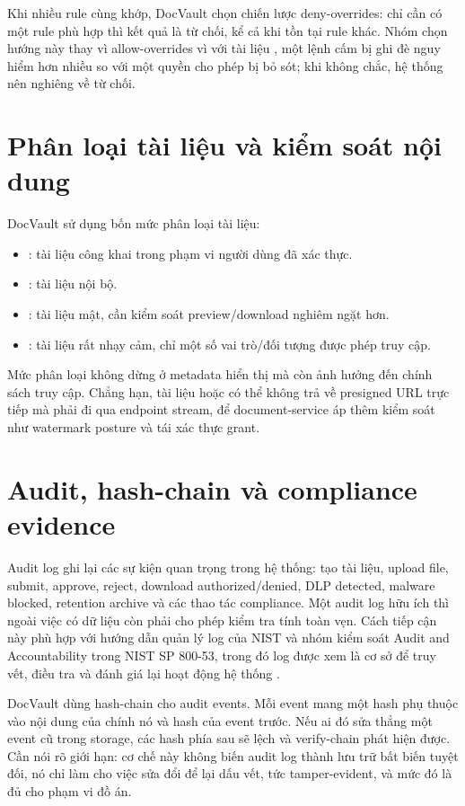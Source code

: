 Khi nhiều rule cùng khớp, DocVault chọn chiến lược deny-overrides: chỉ cần có một rule  phù hợp thì kết quả là từ chối, kể cả khi tồn tại rule  khác. Nhóm chọn hướng này thay vì allow-overrides vì với tài liệu , một lệnh cấm bị ghi đè nguy hiểm hơn nhiều so với một quyền cho phép bị bỏ sót; khi không chắc, hệ thống nên nghiêng về từ chối.

\section{Phân loại tài liệu và kiểm soát nội dung}

DocVault sử dụng bốn mức phân loại tài liệu:

\begin{itemize}
  \item {}: tài liệu công khai trong phạm vi người dùng đã xác thực.
  \item {}: tài liệu nội bộ.
  \item {}: tài liệu mật, cần kiểm soát preview/download nghiêm ngặt hơn.
  \item {}: tài liệu rất nhạy cảm, chỉ một số vai trò/đối tượng được phép truy cập.
\end{itemize}

Mức phân loại không dừng ở metadata hiển thị mà còn ảnh hưởng đến chính sách truy cập. Chẳng hạn, tài liệu  hoặc  có thể không trả về presigned URL trực tiếp mà phải đi qua endpoint stream, để document-service áp thêm kiểm soát như watermark posture và tái xác thực grant.

\section{Audit, hash-chain và compliance evidence}

Audit log ghi lại các sự kiện quan trọng trong hệ thống: tạo tài liệu, upload file, submit, approve, reject, download authorized/denied, DLP detected, malware blocked, retention archive và các thao tác compliance. Một audit log hữu ích thì ngoài việc có dữ liệu còn phải cho phép kiểm tra tính toàn vẹn. Cách tiếp cận này phù hợp với hướng dẫn quản lý log của NIST và nhóm kiểm soát Audit and Accountability trong NIST SP 800-53, trong đó log được xem là cơ sở để truy vết, điều tra và đánh giá lại hoạt động hệ thống \cite{nist_log_management,nist_security_privacy_controls}.

DocVault dùng hash-chain cho audit events. Mỗi event mang một hash phụ thuộc vào nội dung của chính nó và hash của event trước. Nếu ai đó sửa thẳng một event cũ trong storage, các hash phía sau sẽ lệch và verify-chain phát hiện được. Cần nói rõ giới hạn: cơ chế này không biến audit log thành lưu trữ bất biến tuyệt đối, nó chỉ làm cho việc sửa đổi để lại dấu vết, tức tamper-evident, và mức đó là đủ cho phạm vi đồ án.

